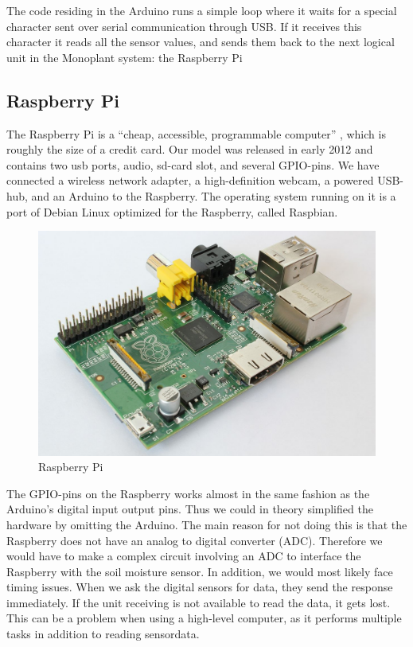 The code residing in the Arduino runs a simple loop where it waits for a special character sent over serial communication through USB. If it receives this character it reads all the sensor values, and sends them back to the next logical unit in the Monoplant system: the Raspberry Pi

\subsection{Raspberry Pi}
The Raspberry Pi is a “cheap, accessible, programmable computer” \citep{Raspberrypi}, which is roughly the size of a credit card. Our model was released in early 2012 and contains two usb ports, audio, sd-card slot, and several GPIO-pins. We have connected a wireless network adapter, a high-definition webcam, a powered USB-hub, and an Arduino to the Raspberry. The operating system running on it is a port of Debian Linux optimized for the Raspberry, called Raspbian. 

\begin{figure}
\centering
\includegraphics[width=1\textwidth]{img/hardware/1200px-RaspberryPi.jpg}
\caption{Raspberry Pi}
\label{fig:Raspberry}
\end{figure}

The GPIO-pins on the Raspberry works almost in the same fashion as the Arduino's digital input output pins. Thus we could in theory simplified the hardware by omitting the Arduino. The main reason for not doing this is that the Raspberry does not have an analog to digital converter (ADC). Therefore we would have to make a complex circuit involving an ADC to interface the Raspberry with the soil moisture sensor. In addition, we would most likely face timing issues. When we ask the digital sensors for data, they send the response immediately. If the unit receiving is not available to read the data, it gets lost. This can be a problem when using a high-level computer, as it performs multiple tasks in addition to reading sensordata. 

